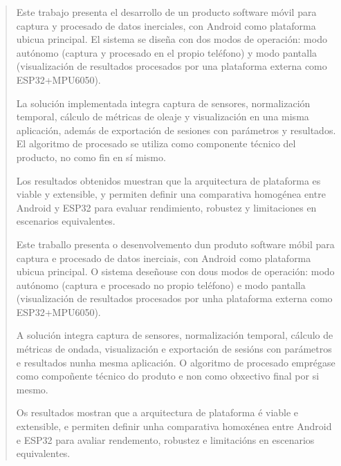 
\pagestyle{empty}
\begin{abstract}
  Este trabajo presenta el desarrollo de un producto software móvil para captura y procesado de datos inerciales, con Android como plataforma ubicua principal. El sistema se diseña con dos modos de operación: modo autónomo (captura y procesado en el propio teléfono) y modo pantalla (visualización de resultados procesados por una plataforma externa como ESP32+MPU6050).

  La solución implementada integra captura de sensores, normalización temporal, cálculo de métricas de oleaje y visualización en una misma aplicación, además de exportación de sesiones con parámetros y resultados. El algoritmo de procesado se utiliza como componente técnico del producto, no como fin en sí mismo.

  Los resultados obtenidos muestran que la arquitectura de plataforma es viable y extensible, y permiten definir una comparativa homogénea entre Android y ESP32 para evaluar rendimiento, robustez y limitaciones en escenarios equivalentes.

  \vspace*{25pt}
  \begin{segundoresumo}
    Este traballo presenta o desenvolvemento dun produto software móbil para captura e procesado de datos inerciais, con Android como plataforma ubicua principal. O sistema deseñouse con dous modos de operación: modo autónomo (captura e procesado no propio teléfono) e modo pantalla (visualización de resultados procesados por unha plataforma externa como ESP32+MPU6050).

    A solución integra captura de sensores, normalización temporal,
    cálculo de métricas de ondada, visualización e exportación de sesións
    con parámetros e resultados nunha mesma aplicación.
    O algoritmo de procesado emprégase como compoñente técnico do produto
    e non como obxectivo final por si mesmo.

    Os resultados mostran que a arquitectura de plataforma é viable e extensible, e permiten definir unha comparativa homoxénea entre Android e ESP32 para avaliar rendemento, robustez e limitacións en escenarios equivalentes.
  \end{segundoresumo}
\vspace*{25pt}

\end{abstract}
\pagestyle{fancy}

